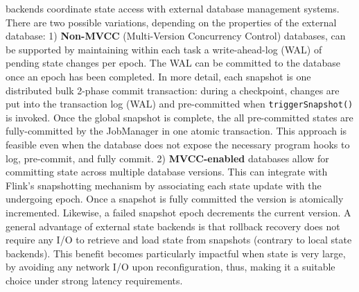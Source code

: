  backends coordinate state access with external database management systems. There are two possible variations, depending on the properties of the external database: 1) \textbf{Non-MVCC} (Multi-Version Concurrency Control) databases, can be supported by maintaining within each task a write-ahead-log (WAL) of pending state changes per epoch. The WAL can be committed to the database once an epoch has been completed. In more detail, each snapshot is one distributed bulk 2-phase commit transaction: during a checkpoint, changes are put into the transaction log (WAL) and pre-committed when \texttt{triggerSnapshot()} is invoked. Once the global snapshot is complete, the all pre-committed states are fully-committed by the JobManager in one atomic transaction. This approach is feasible even when the database does not expose the necessary program hooks to log, pre-commit, and fully commit.
 2) \textbf{MVCC-enabled} databases allow for committing state across multiple database versions. This can integrate with Flink's snapshotting mechanism by associating each state update with the undergoing epoch. Once a snapshot is fully committed the version is atomically incremented. Likewise, a failed snapshot epoch decrements the current version. A general advantage of external state backends is that rollback recovery does not require any I/O to retrieve and load state from snapshots (contrary to local state backends). This benefit becomes particularly impactful when state is very large, by avoiding any network I/O upon reconfiguration, thus, making it a suitable choice under strong latency requirements.
 


